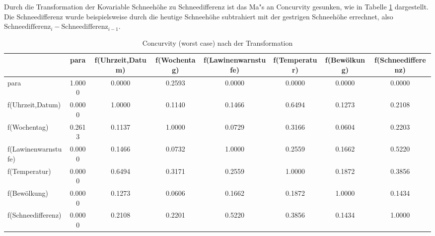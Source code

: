 \noindent Durch die Transformation der Kovariable Schneehöhe zu Schneedifferenz ist das Ma"s an Concurvity gesunken, wie in Tabelle \ref{con2} dargestellt. Die Schneedifferenz wurde beispielsweise durch die heutige Schneehöhe subtrahiert mit der gestrigen Schneehöhe errechnet, also
$\text{Schneedifferenz}_{i}-\text{Schneedifferenz}_{i-1}$.

\begin{table}[htbp]
	\centering
	\caption{Concurvity (worst case) nach der Transformation}
	\begin{adjustbox}{max width=\textwidth}
	\begin{tabular}{lccccccc}
		& para & f(Uhrzeit,Datum) & f(Wochentag) & f(Lawinenwarnstufe) & f(Temperatur) & f(Bewölkung) & f(Schneedifferenz) \\
		\midrule
		\midrule
		para  & 1.0000 & 0.0000 & 0.2593 & 0.0000 & 0.0000 & 0.0000 & 0.0000 \\
		f(Uhrzeit,Datum) & 0.0000 & 1.0000 & 0.1140 & 0.1466 & 0.6494 & 0.1273 & \cellcolor{blue!25}0.2108 \\
		f(Wochentag) & 0.2613 & 0.1137 & 1.0000 & 0.0729 & 0.3166 & 0.0604 & 0.2203 \\
		f(Lawinenwarnstufe) & 0.0000 & 0.1466 & 0.0732 & 1.0000 & 0.2559 & 0.1662 & 0.5220 \\
		f(Temperatur) & 0.0000 & 0.6494 & 0.3171 & 0.2559 & 1.0000 & 0.1872 & \cellcolor{blue!25}0.3856 \\
		f(Bewölkung) & 0.0000 & 0.1273 & 0.0606 & 0.1662 & 0.1872 & 1.0000 & 0.1434 \\
		f(Schneedifferenz) & 0.0000 & 0.2108 & 0.2201 & 0.5220 & 0.3856 & 0.1434 & 1.0000 \\
		\bottomrule
	\end{tabular}%
	\label{con2}%
	\end{adjustbox}
\end{table}%

\newpage
